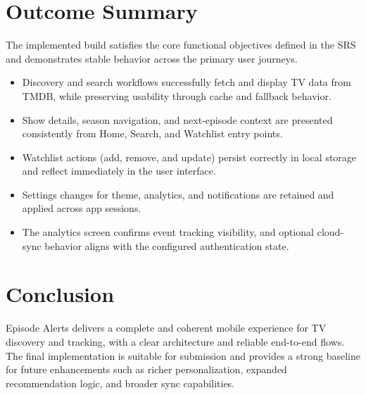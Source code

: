 \section{Outcome Summary}
The implemented build satisfies the core functional objectives defined in the SRS and demonstrates stable behavior across the primary user journeys.

\begin{itemize}
	\item Discovery and search workflows successfully fetch and display TV data from TMDB, while preserving usability through cache and fallback behavior.
	\item Show details, season navigation, and next-episode context are presented consistently from Home, Search, and Watchlist entry points.
	\item Watchlist actions (add, remove, and update) persist correctly in local storage and reflect immediately in the user interface.
	\item Settings changes for theme, analytics, and notifications are retained and applied across app sessions.
	\item The analytics screen confirms event tracking visibility, and optional cloud-sync behavior aligns with the configured authentication state.
\end{itemize}

\section{Conclusion}
Episode Alerts delivers a complete and coherent mobile experience for TV discovery and tracking, with a clear architecture and reliable end-to-end flows. The final implementation is suitable for submission and provides a strong baseline for future enhancements such as richer personalization, expanded recommendation logic, and broader sync capabilities.

